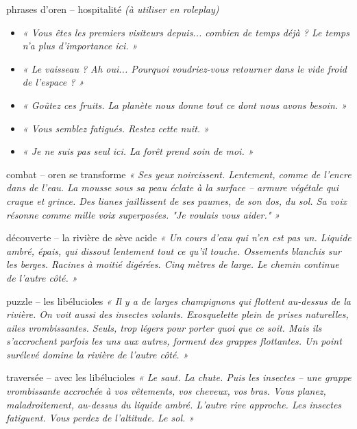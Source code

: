 \documentclass[10pt, a4paper]{article}
\begin{document}
\begin{momentbox}{phrases d'oren -- hospitalité}
\textit{(à utiliser en roleplay)}
\begin{itemize}
    \item \textit{« Vous êtes les premiers visiteurs depuis... combien de temps déjà ? Le temps n'a plus d'importance ici. »}
    \item \textit{« Le vaisseau ? Ah oui... Pourquoi voudriez-vous retourner dans le vide froid de l'espace ? »}
    \item \textit{« Goûtez ces fruits. La planète nous donne tout ce dont nous avons besoin. »}
    \item \textit{« Vous semblez fatigués. Restez cette nuit. »}
    \item \textit{« Je ne suis pas seul ici. La forêt prend soin de moi. »}
\end{itemize}
\end{momentbox}

\begin{momentbox}{combat -- oren se transforme}
\textit{« Ses yeux noircissent. Lentement, comme de l'encre dans de l'eau. La mousse sous sa peau éclate à la surface -- armure végétale qui craque et grince. Des lianes jaillissent de ses paumes, de son dos, du sol. Sa voix résonne comme mille voix superposées. "Je voulais vous aider." »}
\end{momentbox}

\begin{obstaclebox}{découverte -- la rivière de sève acide}
\textit{« Un cours d'eau qui n'en est pas un. Liquide ambré, épais, qui dissout lentement tout ce qu'il touche. Ossements blanchis sur les berges. Racines à moitié digérées. Cinq mètres de large. Le chemin continue de l'autre côté. »}
\end{obstaclebox}

\begin{puzzlebox}{puzzle -- les libélucioles}
\textit{« Il y a de larges champignons qui flottent au-dessus de la rivière. On voit aussi des insectes volants. Exosquelette plein de prises naturelles, ailes vrombissantes. Seuls, trop légers pour porter quoi que ce soit. Mais ils s'accrochent parfois les uns aux autres, forment des grappes flottantes. Un point surélevé domine la rivière de l'autre côté. »}
\end{puzzlebox}

\begin{momentbox}{traversée -- avec les libélucioles}
\textit{« Le saut. La chute. Puis les insectes -- une grappe vrombissante accrochée à vos vêtements, vos cheveux, vos bras. Vous planez, maladroitement, au-dessus du liquide ambré. L'autre rive approche. Les insectes fatiguent. Vous perdez de l'altitude. Le sol. »}
\end{momentbox}
\end{document}
